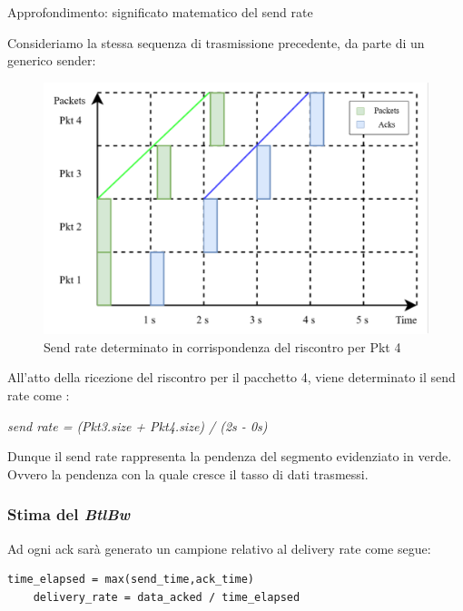 \begin{approfondimento}{Approfondimento: significato matematico del send rate}

Consideriamo la stessa sequenza di trasmissione precedente, da parte di un generico sender:

\begin{figure}[H]

\center
\caption{Send rate determinato in corrispondenza del riscontro per Pkt 4}
\includegraphics[scale=1.1]{chapters/3_bbr/img/send_rate}

\end{figure}

All'atto della ricezione del riscontro per il pacchetto 4, viene determinato il send rate come : \bigskip

\begin{center}

\textit{send rate = (Pkt3.size + Pkt4.size) / (2s - 0s)}

\end{center}

Dunque il send rate rappresenta la pendenza del segmento evidenziato in verde. Ovvero la pendenza con la quale cresce il tasso di dati trasmessi. \bigskip 

\end{approfondimento}

\subsubsection{Stima del \textit{BtlBw}}

Ad ogni ack sarà generato un campione relativo al delivery rate come segue:

\begin{lstlisting}[caption=Delivery rate evaluation]
	time_elapsed = max(send_time,ack_time)
	delivery_rate = data_acked / time_elapsed
\end{lstlisting}

